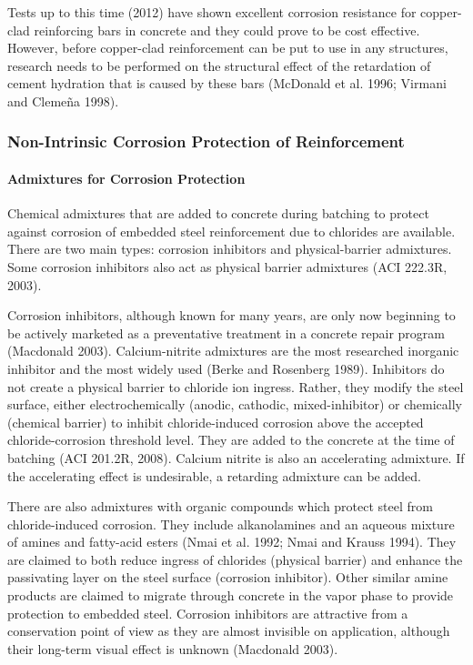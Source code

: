 Tests up to this time (2012) have shown excellent corrosion resistance for copper-clad reinforcing bars in
concrete and they could prove to be cost effective. However, before copper-clad reinforcement can be put to use in
any structures, research needs to be performed on the structural effect of the retardation of cement hydration that is
caused by these bars (McDonald et al. 1996; Virmani and Clemeña 1998).


\subsubsection{Non-Intrinsic Corrosion Protection of Reinforcement}

\paragraph{Admixtures for Corrosion Protection}
Chemical admixtures that are added to concrete during batching to protect against corrosion of embedded steel reinforcement due to chlorides are available. There are two main types: corrosion inhibitors and physical-barrier admixtures. Some corrosion inhibitors also act as physical barrier admixtures (ACI 222.3R, 2003).

Corrosion inhibitors, although known for many years, are only now beginning to be actively marketed as a preventative treatment in a concrete repair program (Macdonald 2003). Calcium-nitrite admixtures are the most researched inorganic inhibitor and the most widely used (Berke and Rosenberg 1989). Inhibitors do not create a physical barrier to chloride ion ingress. Rather, they modify the steel surface, either electrochemically (anodic, cathodic, mixed-inhibitor) or chemically (chemical barrier) to inhibit chloride-induced corrosion above the accepted chloride-corrosion threshold level. They are added to the concrete at the time of batching (ACI 201.2R, 2008). Calcium nitrite is also an accelerating admixture. If the accelerating effect is undesirable, a retarding admixture can be added.

There are also admixtures with organic compounds which protect steel from chloride-induced corrosion. They
include alkanolamines and an aqueous mixture of amines and fatty-acid esters (Nmai et al. 1992; Nmai and Krauss
1994). They are claimed to both reduce ingress of chlorides (physical barrier) and enhance the passivating layer on
the steel surface (corrosion inhibitor). Other similar amine products are claimed to migrate through concrete in the
vapor phase to provide protection to embedded steel. Corrosion inhibitors are attractive from a conservation point of view as they are almost invisible on application, although their long-term visual effect is unknown (Macdonald 2003).


